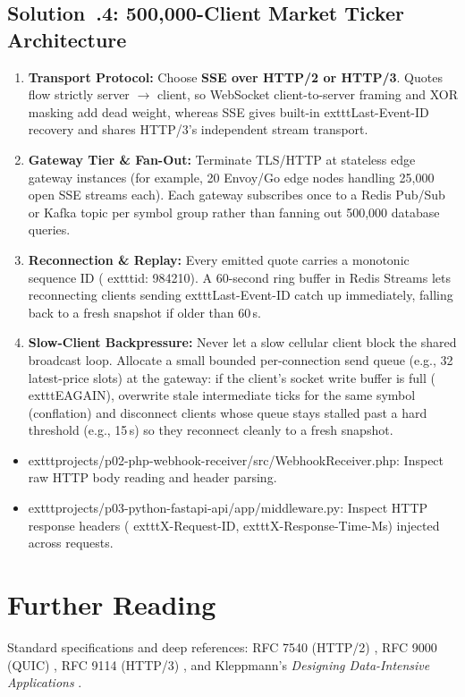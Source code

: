 \subsection{Solution~\thechapter.4: 500,000-Client Market Ticker Architecture}
\begin{enumerate}[leftmargin=15pt]
  \item \textbf{Transport Protocol:} Choose \textbf{SSE over HTTP/2 or HTTP/3}. Quotes flow strictly server $\rightarrow$ client, so WebSocket client-to-server framing and XOR masking add dead weight, whereas SSE gives built-in 	exttt{Last-Event-ID} recovery and shares HTTP/3's independent stream transport.
  \item \textbf{Gateway Tier \& Fan-Out:} Terminate TLS/HTTP at stateless edge gateway instances (for example, 20 Envoy/Go edge nodes handling 25,000 open SSE streams each). Each gateway subscribes once to a Redis Pub/Sub or Kafka topic per symbol group rather than fanning out 500,000 database queries.
  \item \textbf{Reconnection \& Replay:} Every emitted quote carries a monotonic sequence ID (	exttt{id: 984210}). A 60-second ring buffer in Redis Streams lets reconnecting clients sending 	exttt{Last-Event-ID} catch up immediately, falling back to a fresh snapshot if older than 60\,s.
  \item \textbf{Slow-Client Backpressure:} Never let a slow cellular client block the shared broadcast loop. Allocate a small bounded per-connection send queue (e.g., 32 latest-price slots) at the gateway: if the client's socket write buffer is full (	exttt{EAGAIN}), overwrite stale intermediate ticks for the same symbol (conflation) and disconnect clients whose queue stays stalled past a hard threshold (e.g., 15\,s) so they reconnect cleanly to a fresh snapshot.
\end{enumerate}

\begin{labbridgebox}
\begin{itemize}[leftmargin=15pt,itemsep=2pt]
  \item 	exttt{projects/p02-php-webhook-receiver/src/WebhookReceiver.php}: Inspect raw HTTP body reading and header parsing.
  \item 	exttt{projects/p03-python-fastapi-api/app/middleware.py}: Inspect HTTP response headers (	exttt{X-Request-ID}, 	exttt{X-Response-Time-Ms}) injected across requests.
\end{itemize}
\end{labbridgebox}

\section*{Further Reading}
Standard specifications and deep references: RFC 7540 (HTTP/2) \cite{rfc7540}, RFC 9000 (QUIC) \cite{rfc9000}, RFC 9114 (HTTP/3) \cite{rfc9114}, and Kleppmann's \textit{Designing Data-Intensive Applications} \cite{kleppmann2017designing}.
